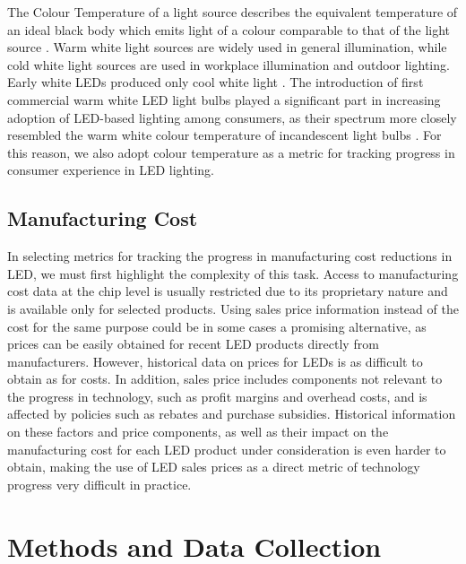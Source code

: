 \documentclass[twoside,twocolumn,9pt]{article}
\begin{document}
The Colour Temperature of a light source describes the equivalent temperature of an ideal black body which emits light of a colour comparable to that of the light source \cite{commission2011cie}. Warm white light sources are widely used in general illumination, while cold white light sources are used in workplace illumination and outdoor lighting. Early white LEDs produced only cool white light \cite{mueller2000light}. The introduction of first commercial warm white LED light bulbs played a significant part in increasing adoption of LED-based lighting among consumers, as their spectrum more closely resembled the warm white colour temperature of incandescent light bulbs \cite{al2016optics}. For this reason, we also adopt colour temperature as a metric for tracking progress in consumer experience in LED lighting.

\subsection{Manufacturing Cost}

In selecting metrics for tracking the progress in manufacturing cost reductions in LED, we must first highlight  the complexity of this task. Access to manufacturing cost data at the chip level is usually restricted due to its proprietary nature and is available only for selected products. Using sales price information instead of the cost for the same purpose could be in some cases a promising alternative, as prices can be easily obtained for recent LED products directly from manufacturers. However, historical data on prices for LEDs is as difficult to obtain as for costs. In addition, sales price includes components not relevant to the progress in technology, such as profit margins and overhead costs, and is affected by policies such as rebates and purchase subsidies. Historical information on these factors and price components, as well as their impact on the manufacturing cost for each LED product under consideration is even harder to obtain, making the use of LED sales prices as a direct metric of technology progress very difficult in practice. 

\section{Methods and Data Collection}
\end{document}
